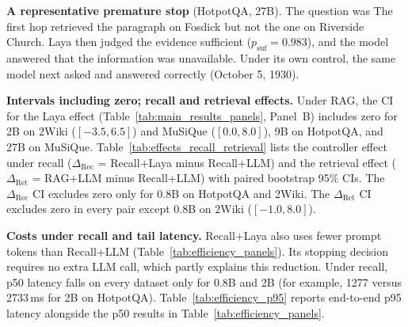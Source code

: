 \textbf{A representative premature stop} (HotpotQA, 27B). The question was  The first hop retrieved the paragraph on Fosdick but not the one on Riverside
Church. Laya then judged the evidence sufficient ($p_{\mathrm{suf}}=0.983$), and the
model answered that the information was unavailable. Under its own control, the same
model next asked  and answered correctly
(October 5, 1930).

\textbf{Intervals including zero; recall and retrieval effects.} Under RAG, the CI for the
Laya effect (Table~\ref{tab:main_results_panels}, Panel~B) includes zero for 2B on 2Wiki
($[-3.5, 6.5]$) and MuSiQue ($[0.0, 8.0]$), 9B on HotpotQA, and 27B on MuSiQue.
Table~\ref{tab:effects_recall_retrieval} lists the
controller effect under recall ($\Delta_{\mathrm{Rec}}$ = Recall+Laya minus Recall+LLM) and
the retrieval effect ($\Delta_{\mathrm{Ret}}$ = RAG+LLM minus Recall+LLM) with paired
bootstrap 95\% CIs. The $\Delta_{\mathrm{Rec}}$ CI excludes zero only for 0.8B on HotpotQA
and 2Wiki. The $\Delta_{\mathrm{Ret}}$ CI excludes zero in every pair except 0.8B on 2Wiki
($[-1.0, 8.0]$).


\textbf{Costs under recall and tail latency.} Recall+Laya also uses fewer prompt tokens
than Recall+LLM (Table~\ref{tab:efficiency_panels}). Its stopping decision requires no
extra LLM call, which partly explains this reduction. Under recall, p50 latency falls on
every dataset only for 0.8B and 2B (for example, 1277 versus 2733\,ms for 2B on
HotpotQA). Table~\ref{tab:efficiency_p95} reports end-to-end p95 latency alongside the
p50 results in Table~\ref{tab:efficiency_panels}.

